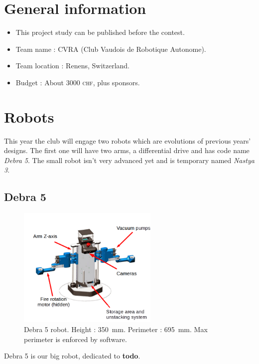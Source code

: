\documentclass[a4paper]{paper}
\begin{document}


\section{General information}
\begin{itemize}
    \item This project study can be published before the contest.
    \item Team name : CVRA (Club Vaudois de Robotique Autonome).
    \item Team location : Renens, Switzerland.
    \item Budget : About 3000 \textsc{chf}, plus sponsors.
\end{itemize}

\section{Robots}
This year the club will engage two robots which are evolutions of previous years' designs.
The first one will have two arms, a differential drive and has code name \textit{Debra 5}.
The small robot isn't very advanced yet and is temporary named \textit{Nastya 3}.

\subsection{Debra 5}
\begin{figure}[h]
    \begin{center}
        \includegraphics[width=0.6\textwidth]{images/debra_explained}
        \caption{Debra 5 robot.
            Height : \SI{350}{\milli\meter}.
            Perimeter : \SI{695}{\milli\meter}.
            Max perimeter is enforced by software.
        }
        \label{fig:debra}
    \end{center}
\end{figure}
Debra 5 is our big robot, dedicated to \textbf{todo}.
\end{document}

